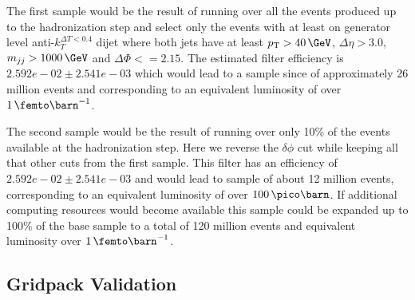 The first sample would be the result of running over all the events produced up to the hadronization step and select only the events with at least on generator level anti-$k_T^{\Delta T < 0.4}$ dijet where both jets have at least $\pt > 40\,\GeV$, $\Delta\eta > 3.0$, $m_{jj} > 1000\,\GeV$ and $\Delta\Phi<=2.15$. The estimated filter efficiency is $2.592e-02 \pm 2.541e-03$
which would lead to a sample since of approximately 26 million events and corresponding to an equivalent luminosity of over $1\,\femto\barn^{-1}$.

The second sample would be the result of running over only 10\% of the events available at the hadronization step. Here we reverse the $\delta\phi$ cut while keeping all that other cuts from the first sample. This filter has an efficiency of $2.592e-02 \pm 2.541e-03$  and would lead to sample of about 12 million events, corresponding to an equivalent luminosity of over $100\,\pico\barn$. If additional computing resources would become available this sample could be expanded up to 100\% of the base sample to a total of 120 million events and equivalent luminosity over $1\,\femto\barn^{-1}$.

\subsection{Gridpack Validation}
\label{SUBSECTION:GridpackValidation}

% 
% 
% 





